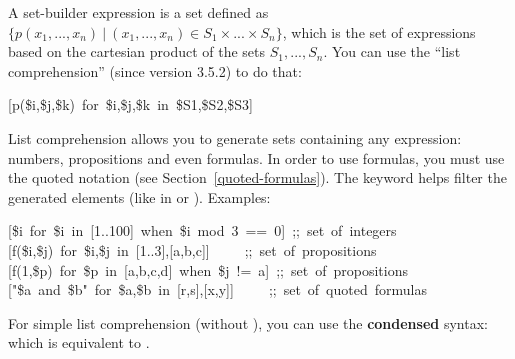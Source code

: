 \noindent A set-builder expression is a set defined as
$\{p(x_1,...,x_n)~|~(x_1,...,x_n) \in S_1 \times ... \times S_n \}$,
which is the set of expressions based on the cartesian product of
the sets $S_1,...,S_n$. You can use the \textquotedblleft{}list comprehension\textquotedblright{} (since
version 3.5.2) to do that:%
\begin{mdpre}%
\noindent{}[p({\$i},{\$j},{\$k})~{for}~{\$i},{\$j},{\$k}~{in}~{\$S1},{\$S2},{\$S3}]%
\end{mdpre}\noindent List comprehension allows you to generate sets containing any expression:
numbers, propositions and even formulas. In order to use formulas, you
must use the quoted notation (see Section~\ref{quoted-formulas}). The 
keyword helps filter the generated elements (like in  or
). Examples:
\begin{mdpre}%
\noindent{}[{\$i}~{for}~{\$i}~{in}~{}[{1}..{100}]~{when}~{\$i}~{mod}~{3}~==~{0}]~{;;~set~of~integers}\\
{}[f({\$i},{\$j})~{for}~{\$i},{\$j}~{in}~{}[{1}..{3}],{}[a,b,c]]~~~~~{;;~set~of~propositions}\\
{}[f({1},{\$p})~{for}~{\$p}~{in}~{}[a,b,c,d]~{when}~{\$j}~!=~a]~{;;~set~of~propositions}\\
{}["{\$a}~and~{\$b}"~{for}~{\$a},{\$b}~{in}~{}[r,s],{}[x,y]]~~~~~{;;~set~of~quoted~formulas}%
\end{mdpre}\noindent For simple list comprehension (without ), you can use the
\textbf{condensed} syntax:  which is equivalent to
.

